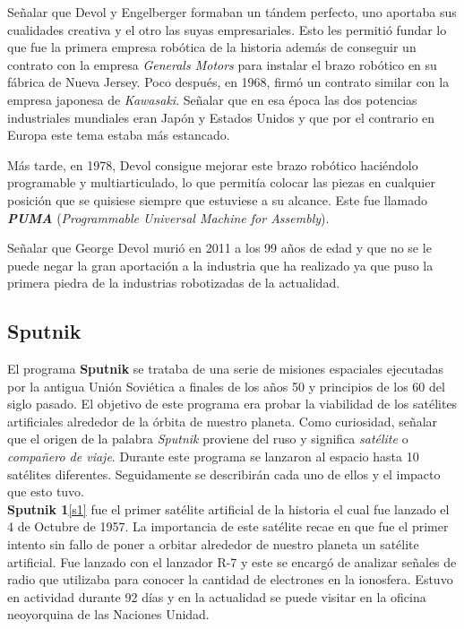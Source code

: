 Señalar que Devol y  Engelberger formaban un tándem perfecto, uno aportaba sus cualidades creativa y el otro las suyas empresariales. Esto les permitió fundar lo que fue la primera empresa robótica de la historia además de conseguir un contrato con la empresa \textit{Generals Motors} para instalar el brazo robótico en su fábrica de Nueva Jersey. Poco después, en 1968, firmó un contrato similar con la empresa japonesa de \textit{Kawasaki}. Señalar que en esa época las dos potencias industriales mundiales eran Japón y Estados Unidos y que por el contrario en Europa este tema estaba más estancado.

Más tarde, en 1978, Devol consigue mejorar este brazo robótico haciéndolo programable y multiarticulado, lo que permitía colocar las piezas en cualquier posición que se quisiese siempre que estuviese a su alcance. Este fue llamado \textbf{\textit{PUMA}} (\textit{Programmable Universal Machine for Assembly}).

Señalar que George Devol murió en 2011 a los 99 años de edad y que no se le puede negar la gran aportación a la industria que ha realizado ya que puso la primera piedra de la industrias robotizadas de la actualidad.






\subsection{Sputnik}

El programa \textbf{Sputnik} se trataba de una serie de misiones espaciales ejecutadas por la antigua Unión Soviética a finales de los años 50 y principios de los 60 del siglo pasado. El objetivo de este programa era probar la viabilidad de los satélites artificiales alrededor de la órbita de nuestro planeta.
Como curiosidad, señalar que el origen de la palabra \textit{Sputnik} proviene del ruso y significa \textit{satélite} o \textit{compañero de viaje}.
Durante este programa se lanzaron al espacio hasta 10 satélites diferentes. Seguidamente se describirán cada uno de ellos y el impacto que esto tuvo.\\


\textbf{Sputnik 1}\ref{s1} fue el primer satélite artificial de la historia el cual fue lanzado el 4 de Octubre de 1957. La importancia de este satélite recae en que fue el primer intento sin fallo de poner a orbitar alrededor de nuestro planeta un satélite artificial. Fue lanzado con el lanzador R-7 y este se encargó de analizar señales de radio que utilizaba para conocer la cantidad de electrones en la ionosfera. Estuvo en actividad durante 92 días y en la actualidad se puede visitar en la oficina neoyorquina de las Naciones Unidad.\\ 

